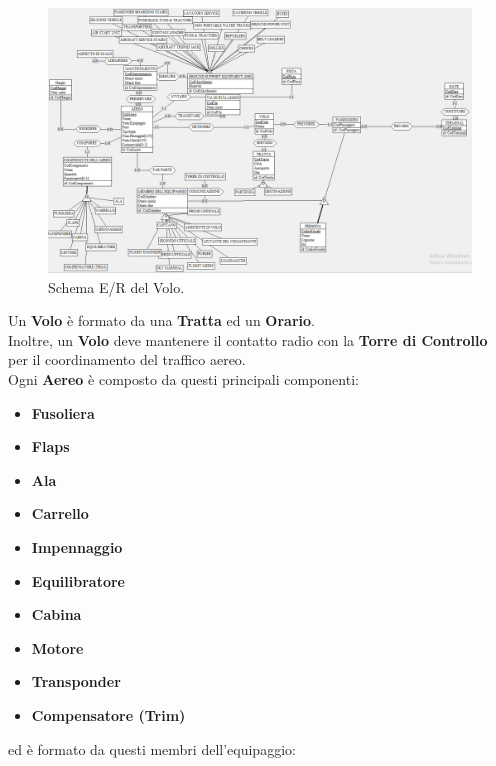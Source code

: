 \begin{figure}[H] %
	\centering
	\includegraphics[width=1.2\linewidth, height=1.2\textheight, keepaspectratio]{./img/Volo.png}
	\caption{Schema E/R del Volo.}
	\label{fig:schema_volo}
\end{figure}

\textsf{\small Un \textbf{Volo} è formato da una \textbf{Tratta} ed un \textbf{Orario}.}\\

\textsf{\small Inoltre, un \textbf{Volo} deve mantenere il contatto radio con la \textbf{Torre di Controllo} per il coordinamento del traffico aereo.}\\

\textsf{\small Ogni \textbf{Aereo} è composto da questi principali componenti:}

\begin{itemize}
	\item \textbf{\small Fusoliera}
	\item \textbf{\small Flaps}
	\item \textbf{\small Ala}
	\item \textbf{\small Carrello}
	\item \textbf{\small Impennaggio}
	\item \textbf{\small Equilibratore}
	\item \textbf{\small Cabina}
	\item \textbf{\small Motore}
	\item \textbf{\small Transponder}
	\item \textbf{\small Compensatore (Trim)}
\end{itemize}

\textsf{\small ed è formato da questi membri dell'equipaggio:}

